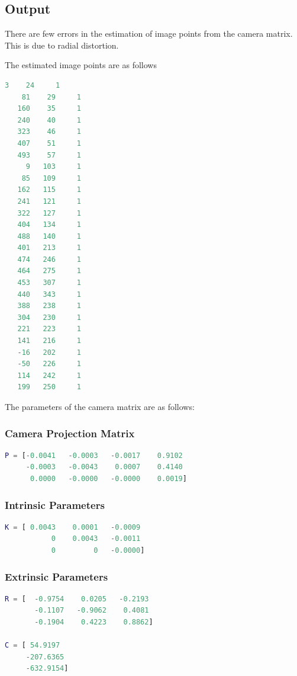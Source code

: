 \documentclass[12pt]{article}
\begin{document}
\subsection{Output}

There are few errors in the estimation of image points from the camera matrix. This is due to radial distortion. 

The estimated image points are as follows
\begin{lstlisting}[language=matlab]
     3    24     1
    81    29     1
   160    35     1
   240    40     1
   323    46     1
   407    51     1
   493    57     1
     9   103     1
    85   109     1
   162   115     1
   241   121     1
   322   127     1
   404   134     1
   488   140     1
   401   213     1
   474   246     1
   464   275     1
   453   307     1
   440   343     1
   388   238     1
   304   230     1
   221   223     1
   141   216     1
   -16   202     1
   -50   226     1
   114   242     1
   199   250     1
   \end{lstlisting}
The parameters of the camera matrix are as follows:
\subsubsection{Camera Projection Matrix} 
\begin{lstlisting}[language=matlab]
P = [-0.0041   -0.0003   -0.0017    0.9102
     -0.0003   -0.0043    0.0007    0.4140
      0.0000   -0.0000   -0.0000    0.0019]
\end{lstlisting}
\subsubsection{Intrinsic Parameters}
\begin{lstlisting}[language=matlab]
K = [ 0.0043    0.0001   -0.0009
           0    0.0043   -0.0011
           0         0   -0.0000]
\end{lstlisting}
\subsubsection{Extrinsic Parameters}
\begin{lstlisting}[language=matlab]
R = [  -0.9754    0.0205   -0.2193
       -0.1107   -0.9062    0.4081
       -0.1904    0.4223    0.8862]
      
C = [ 54.9197
     -207.6365
     -632.9154]
\end{lstlisting}
\end{document}
